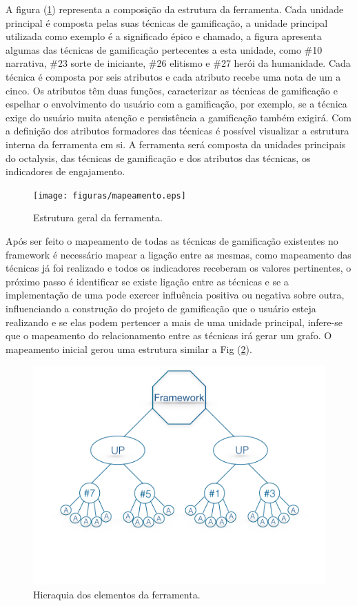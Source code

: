 A figura (\ref{fig03}) representa a composição da estrutura da ferramenta. Cada unidade principal é composta pelas suas técnicas de gamificação, a unidade principal utilizada como exemplo é a significado épico e chamado, a figura apresenta algumas das técnicas de gamificação pertecentes a esta unidade, como \#10 narrativa, \#23 sorte de iniciante, \#26 elitismo e \#27 herói da humanidade. Cada técnica é composta por seis atributos e cada atributo recebe uma nota de um a cinco. Os atributos têm duas funções, caracterizar as técnicas de gamificação e espelhar o envolvimento do usuário com a gamificação, por exemplo, se a técnica exige do usuário muita atenção e persistência a gamificação também exigirá. Com a definição dos atributos formadores das técnicas é possível visualizar a estrutura interna da ferramenta em si. A ferramenta será composta da unidades principais do octalysis, das técnicas de gamificação e dos atributos das técnicas, os indicadores de engajamento. 


\begin{figure}[h]
	\centering
		\texttt{[image: figuras/mapeamento.eps]}
	\caption{Estrutura geral da ferramenta.\label{fig03}
}
\end{figure}
\newpage


Após ser feito o mapeamento de todas as técnicas de gamificação existentes no framework é necessário mapear a ligação entre as mesmas, como mapeamento das técnicas já foi realizado e todos os indicadores receberam os valores pertinentes, o próximo passo é identificar se existe ligação entre as técnicas e se a implementação de uma pode exercer influência positiva ou negativa sobre outra, influenciando a construção do projeto de gamificação que o usuário esteja realizando e se elas podem pertencer a mais de uma unidade principal, infere-se que o mapeamento do relacionamento entre as técnicas irá gerar um grafo. O mapeamento inicial gerou uma estrutura similar a Fig (\ref{fig04}).

\begin{figure}[h]
	\centering
		\includegraphics[keepaspectratio=true,scale=0.5]{figuras/heranca.png}
	\caption{Hieraquia dos elementos da ferramenta.	\label{fig04}
}
\end{figure}

